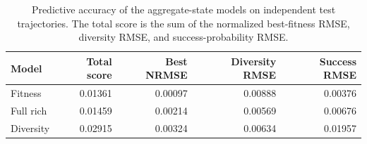\begin{table}[!htbp]
    \centering
    \caption{Predictive accuracy of the aggregate-state models on independent test trajectories. The total score is the sum of the normalized best-fitness RMSE, diversity RMSE, and success-probability RMSE.}
    \label{tab:aggregate-model-comparison}
    \begin{tabular}{lrrrr}
        \hline
        \textbf{Model} & \textbf{Total score} & \textbf{Best NRMSE} & \textbf{Diversity RMSE} & \textbf{Success RMSE} \\
        \hline
        Fitness & 0.01361 & 0.00097 & 0.00888 & 0.00376 \\
        Full rich & 0.01459 & 0.00214 & 0.00569 & 0.00676 \\
        Diversity & 0.02915 & 0.00324 & 0.00634 & 0.01957 \\
        \hline
    \end{tabular}
\end{table}
